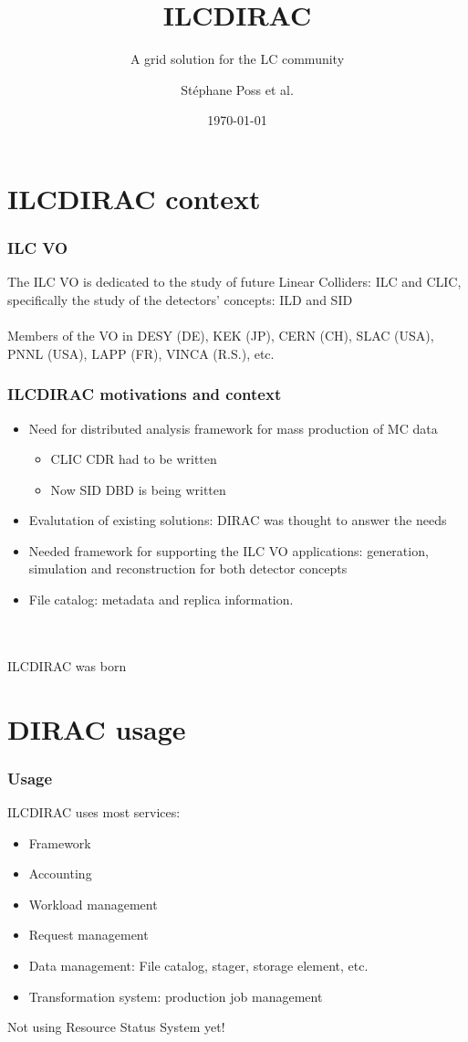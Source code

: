 \documentclass{beamer}
\title{ILCDIRAC}
\subtitle{A grid solution for the LC community}
\author{St\'ephane Poss et al.}
\institute[CERN]
{
 CERN
}
\date{\today}
\begin{document}
\begin{frame}
\titlepage
\end{frame}

\begin{frame}
  \tableofcontents
\end{frame}

\section{ILCDIRAC context}
\label{sec:context}

\begin{frame}
  \frametitle{ILC VO}
The {\color{blue} ILC VO} is dedicated to the study of \alert{future
  Linear Colliders: ILC and CLIC}, specifically the study of the
detectors' concepts: ILD and SID\\
~\\
Members of the VO in DESY (DE), KEK (JP), CERN (CH), SLAC (USA), PNNL
(USA), LAPP (FR), VINCA (R.S.), etc.
\end{frame}

\begin{frame}
  \frametitle{ILCDIRAC motivations and context}
  \begin{itemize}
  \item Need for distributed analysis framework for mass production of
    MC data
    \begin{itemize}
    \item CLIC CDR had to be written
    \item Now SID DBD is being written
    \end{itemize}
  \item Evalutation of existing solutions: DIRAC was thought to
    answer the needs
  \item Needed framework for supporting the ILC VO applications:
    generation, simulation and reconstruction for both detector concepts 
  \item File catalog: metadata and replica information.
  \end{itemize}
~\\
~\\
\hspace{4cm} \alert{ILCDIRAC was born}

\end{frame}

\section{DIRAC usage}
\begin{frame}
  \frametitle{Usage}
ILCDIRAC uses most services:
\begin{itemize}
\item Framework
\item Accounting
\item Workload management
\item Request management
\item Data management: File catalog, stager, storage element, etc.
\item Transformation system: production job management
\end{itemize}
Not using Resource Status System yet!
\end{frame}
\end{document}
